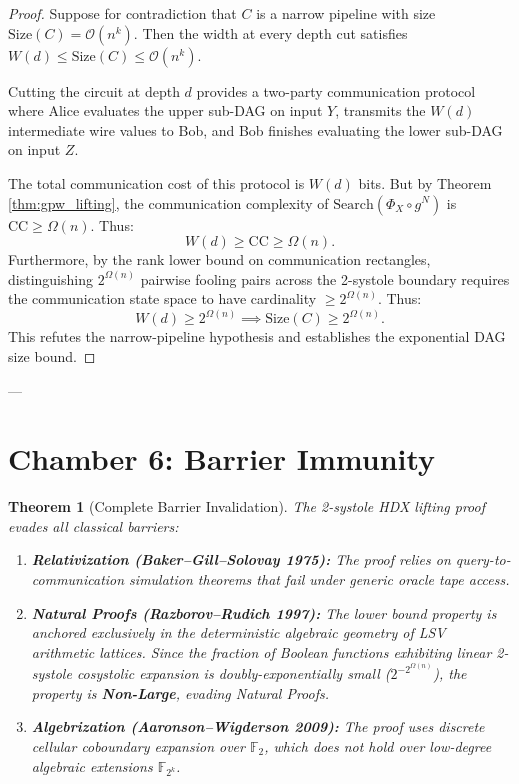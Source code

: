 \documentclass[11pt,a4paper]{article}
\theoremstyle{plain}
\newtheorem{theorem}{Theorem}[section]
\theoremstyle{definition}
\theoremstyle{remark}
\newcommand{\Size}{\mathrm{Size}}
\newcommand{\CC}{\mathrm{CC}}
\newcommand{\Search}{\mathrm{Search}}
\begin{document}
\begin{proof}
Suppose for contradiction that $C$ is a narrow pipeline with size $\Size(C) = \mathcal{O}(n^k)$. Then the width at every depth cut satisfies $W(d) \le \Size(C) \le \mathcal{O}(n^k)$. 

Cutting the circuit at depth $d$ provides a two-party communication protocol where Alice evaluates the upper sub-DAG on input $Y$, transmits the $W(d)$ intermediate wire values to Bob, and Bob finishes evaluating the lower sub-DAG on input $Z$. 

The total communication cost of this protocol is $W(d)$ bits. But by Theorem \ref{thm:gpw_lifting}, the communication complexity of $\Search(\Phi_X \circ g^N)$ is $\CC \ge \Omega(n)$. Thus:
\[
W(d) \ge \CC \ge \Omega(n).
\]
Furthermore, by the rank lower bound on communication rectangles, distinguishing $2^{\Omega(n)}$ pairwise fooling pairs across the 2-systole boundary requires the communication state space to have cardinality $\ge 2^{\Omega(n)}$. Thus:
\[
W(d) \ge 2^{\Omega(n)} \implies \Size(C) \ge 2^{\Omega(n)}.
\]
This refutes the narrow-pipeline hypothesis and establishes the exponential DAG size bound.
\end{proof}

---

\section{Chamber 6: Barrier Immunity}

\begin{theorem}[Complete Barrier Invalidation]\label{thm:barrier_immunity}
The 2-systole HDX lifting proof evades all classical barriers:
\begin{enumerate}
    \item \textbf{Relativization (Baker--Gill--Solovay 1975):} The proof relies on query-to-communication simulation theorems that fail under generic oracle tape access.
    \item \textbf{Natural Proofs (Razborov--Rudich 1997):} The lower bound property is anchored exclusively in the deterministic algebraic geometry of LSV arithmetic lattices. Since the fraction of Boolean functions exhibiting linear 2-systole cosystolic expansion is doubly-exponentially small ($2^{-2^{\Omega(n)}}$), the property is \textbf{Non-Large}, evading Natural Proofs.
    \item \textbf{Algebrization (Aaronson--Wigderson 2009):} The proof uses discrete cellular coboundary expansion over $\mathbb{F}_2$, which does not hold over low-degree algebraic extensions $\mathbb{F}_{2^k}$.
\end{enumerate}
\end{theorem}
\end{document}
